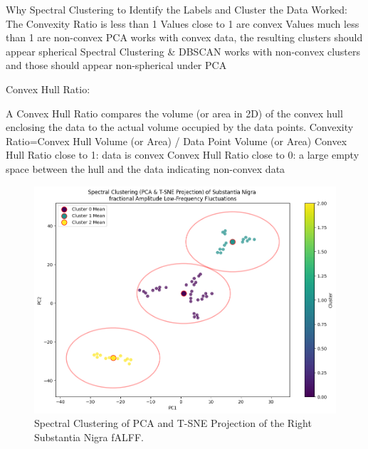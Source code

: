 \documentclass[12pt]{article}
\begin{document}
Why Spectral Clustering to Identify the Labels and Cluster the Data Worked:
The Convexity Ratio is less than 1
Values close to 1 are convex
Values much less than 1 are non-convex
PCA works with convex data, the resulting clusters should appear spherical
Spectral Clustering \& DBSCAN works with non-convex clusters and those should appear non-spherical under PCA

Convex Hull Ratio:

A Convex Hull Ratio compares the volume (or area in 2D) of the convex hull enclosing the data to the actual volume occupied by the data points.
Convexity Ratio=Convex Hull Volume (or Area) / Data Point Volume (or Area)
Convex Hull Ratio close to 1: data is convex
Convex Hull Ratio close to 0: a large empty space between the hull and the data indicating non-convex data


\FloatBarrier

\begin{figure}[h]  %
    \centering
    \includegraphics[width=\textwidth]{"../img/fALFF_SN_Spectral_Clustering.png"}  %
    \caption{Spectral Clustering of PCA and T-SNE Projection of the Right Substantia Nigra fALFF.}
    \label{fig:clustering}  %
\end{figure}

\FloatBarrier  %
\end{document}
